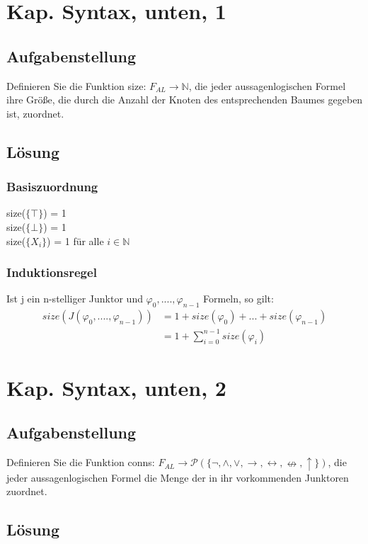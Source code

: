 \documentclass[12pt, a4paper]{article}
\begin{document}
\section*{Kap. Syntax, unten, 1}
\subsection*{Aufgabenstellung}
Definieren Sie die Funktion size: $F_{AL} \rightarrow \mathds{N}$, die jeder aussagenlogischen Formel ihre Größe, die durch die Anzahl der Knoten des entsprechenden Baumes gegeben ist, zuordnet.

\subsection*{Lösung}
\subsubsection*{Basiszuordnung}
size($\{ \top \}$) = 1\\
size($\{ \bot \}$) = 1\\
size($\{ X_i \}$) = 1 für alle $i \in \mathds{N}$
\subsubsection*{Induktionsregel}
Ist j ein n-stelliger Junktor und $\varphi_0,....,\varphi_{n-1}$ Formeln, so gilt:\\
\begin{equation}
\begin{split}
size(J(\varphi_0,....,\varphi_{n-1})) &= 1 + size(\varphi_0) + ... + size(\varphi_{n-1})\\
&= 1 + \sum^{n-1}_{i=0} size(\varphi_i)
\end{split}
\end{equation}

\section*{Kap. Syntax, unten, 2}
\subsection*{Aufgabenstellung}
Definieren Sie die Funktion conns: $F_{AL} \rightarrow \mathcal{P}(\{ \neg ,\wedge ,\vee ,\rightarrow,\leftrightarrow ,\nleftrightarrow ,\uparrow \})$, die jeder aussagenlogischen Formel die Menge der in ihr vorkommenden Junktoren zuordnet.
\subsection*{Lösung}
\end{document}

